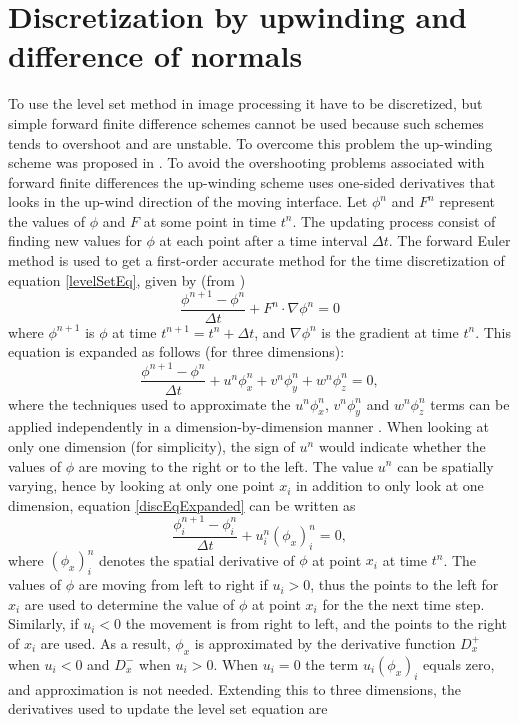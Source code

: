 \section{Discretization by upwinding and difference of normals}
To use the level set method in image processing it have to be discretized, but simple forward finite difference schemes cannot be used because such schemes tends to overshoot and are unstable. To overcome this problem the up-winding scheme was proposed in \cite{osher88}. To avoid the overshooting problems associated with forward finite differences the up-winding scheme uses one-sided derivatives that looks in the up-wind direction of the moving interface. Let \(\phi^n\) and \(F^n\) represent the values of \(\phi\) and \(F\) at some point in time \(t^n\). The updating process consist of finding new values for \(\phi\) at each point after a time interval \(\Delta t\). The forward Euler method is used to get a first-order accurate method for the time discretization of equation \ref{levelSetEq}, given by (from \cite{osher02})
\begin{equation}
\frac{\phi^{n+1}-\phi^n}{\Delta t} + F^n \cdot \nabla \phi^n = 0
\label{discEq}
\end{equation}
where \(\phi^{n+1}\) is \(\phi\) at time \(t^{n+1} = t^n + \Delta t\), and \(\nabla \phi^n\) is the gradient at time \(t^n\). This equation is expanded as follows (for three dimensions):
\begin{equation}
\frac{\phi^{n+1}-\phi^n}{\Delta t} + u^n \phi_x^n + v^n \phi_y^n + w^n \phi_z^n= 0,
\label{discEqExpanded}
\end{equation}
where the techniques used to approximate the \(u^n \phi_x^n\), \(v^n \phi_y^n \) and \(w^n \phi_z^n\) terms can be applied independently in a dimension-by-dimension manner \cite{osher02}. When looking at only one dimension (for simplicity), the sign of \(u^n\) would indicate whether the values of \(\phi\) are moving to the right or to the left. The value \(u^n\) can be spatially varying, hence by looking at only one point \(x_i\) in addition to only look at one dimension, equation \ref{discEqExpanded} can be written as
\begin{equation}
\frac{\phi_i^{n+1}-\phi_i^n}{\Delta t} + u_i^n (\phi_x)_i^n = 0,
\label{discEq1DPoint}
\end{equation}  
where \((\phi_x)_i^n\) denotes the spatial derivative of \(\phi\) at point \(x_i\) at time \(t^n\). The values of \(\phi\) are moving from left to right if \(u_i > 0\), thus the points to the left for \(x_i\) are used to determine the value of \(\phi\) at point \(x_i\) for the the next time step. Similarly, if \(u_i < 0\) the movement is from right to left, and the points to the right of \(x_i\) are used. As a result, \(\phi_x\) is approximated by the derivative function \(D_x^+\) when \(u_i < 0\) and \(D_x^-\) when \(u_i > 0\). When \(u_i = 0\) the term \(u_i(\phi_x)_i\) equals zero, and approximation is not needed. Extending this to three dimensions, the derivatives used to update the level set equation are 
